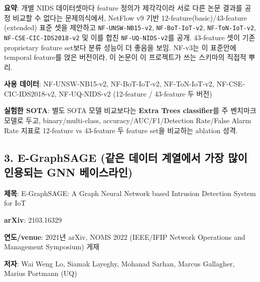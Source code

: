 \par\noindent \textbullet\enspace \textbf{요약}: 개별 NIDS 데이터셋마다 feature 정의가 제각각이라 서로 다른 논문 결과를 공정 비교할 수 없다는 문제의식에서, NetFlow v9 기반 12-feature(basic)/\allowbreak{}43-feature (extended) 표준 셋을 제안하고 \texttt{NF-\allowbreak{}UNSW-\allowbreak{}NB15-\allowbreak{}v2}, \texttt{NF-\allowbreak{}BoT-\allowbreak{}I\allowbreak{}oT-\allowbreak{}v2}, \texttt{NF-\allowbreak{}ToN-\allowbreak{}I\allowbreak{}oT-\allowbreak{}v2}, \texttt{NF-\allowbreak{}CSE-\allowbreak{}C\allowbreak{}IC-\allowbreak{}IDS20\allowbreak{}18-\allowbreak{}v2} 및 이를 합친 \texttt{NF-\allowbreak{}UQ-\allowbreak{}NI\allowbreak{}DS-\allowbreak{}v2}를 공개. 43-feature 셋이 기존 proprietary feature set보다 분류 성능이 더 좋음을 보임. NF-v3는 이 표준안에 temporal feature를 얹은 버전이라, 이 논문이 이 프로젝트가 쓰는 스키마의 직접적 뿌리.


\par\noindent \textbullet\enspace \textbf{사용 데이터}: NF-UNSW-NB15-v2, NF-BoT-IoT-v2, NF-ToN-IoT-v2, NF-CSE-CIC-IDS2018-v2, NF-UQ-NIDS-v2 (12-feature /\allowbreak{} 43-feature 두 버전)


\par\noindent \textbullet\enspace \textbf{실험한 SOTA}: 별도 SOTA 모델 비교보다는 \textbf{Extra Trees classifier}를 주 벤치마크 모델로 두고, binary/\allowbreak{}multi-class, accuracy/\allowbreak{}AUC/\allowbreak{}F1/\allowbreak{}Detection Rate/\allowbreak{}False Alarm Rate 지표로 12-feature vs 43-feature 두 feature set을 비교하는 ablation 성격.


\subsection{3. E-GraphSAGE (같은 데이터 계열에서 가장 많이 인용되는 GNN 베이스라인)}
\par\noindent \textbullet\enspace \textbf{제목}: E-GraphSAGE: A Graph Neural Network based Intrusion Detection System for IoT


\par\noindent \textbullet\enspace \textbf{arXiv}: 2103.16329


\par\noindent \textbullet\enspace \textbf{연도/\allowbreak{}venue}: 2021년 arXiv, NOMS 2022 (IEEE/\allowbreak{}IFIP Network Operations and Management Symposium) 게재


\par\noindent \textbullet\enspace \textbf{저자}: Wai Weng Lo, Siamak Layeghy, Mohanad Sarhan, Marcus Gallagher, Marius Portmann (UQ)


